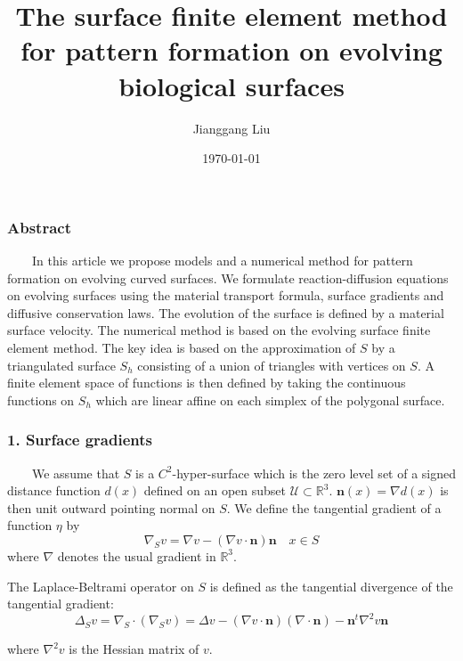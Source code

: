 \documentclass[notheorems,serif]{beamer}
\begin{document}
\title[]{The surface finite element method for pattern formation on evolving biological surfaces}
\author[]{Jianggang Liu\\
}
\date{\today}

\frame[plain]{\titlepage}

\begin{frame}
\frametitle{\small Abstract}
$\qquad$In this article we propose models and a numerical method for pattern formation on evolving curved surfaces. We formulate reaction-diffusion equations on evolving surfaces using the material transport formula, surface gradients and diffusive conservation laws. The evolution of the surface is defined by a material surface velocity. The numerical method is based on the evolving surface finite element method. The key idea is based on the approximation of $S$ by a triangulated surface $S_h$ consisting of a union of triangles with vertices on $S$. A finite element space of functions is then defined by taking the continuous functions on $S_h$ which are linear affine on each simplex of the polygonal surface.  
\end{frame}

\begin{frame}
\frametitle{\small 1. Surface gradients}
$\qquad$We assume that $S$ is a $C^2$-hyper-surface which is the zero level set of a signed distance function $d(x)$ defined on an open subset $\mathcal{U}\subset\mathbb{R}^3$. $\boldsymbol{n}(x)=\nabla d(x)$ is then unit outward pointing normal on $S$. We define the tangential gradient of a function $\eta$ by
\begin{equation*}
\nabla_S v=\nabla v-(\nabla v\cdot\boldsymbol{n})\boldsymbol{n} \quad x\in S
\end{equation*}
where $\nabla$ denotes the usual gradient in $\mathbb{R}^3$.  

The Laplace-Beltrami operator on $S$ is defined as the tangential divergence of the tangential gradient:  
\begin{equation*}
\Delta_S v=\nabla_S\cdot(\nabla_S v)=\Delta v-(\nabla v\cdot\boldsymbol{n})(\nabla\cdot\boldsymbol{n})-\boldsymbol{n}^t\nabla^2v\boldsymbol{n} 
\end{equation*}

where $\nabla^2v$ is the Hessian matrix of $v$.
\end{frame}
\end{document}
